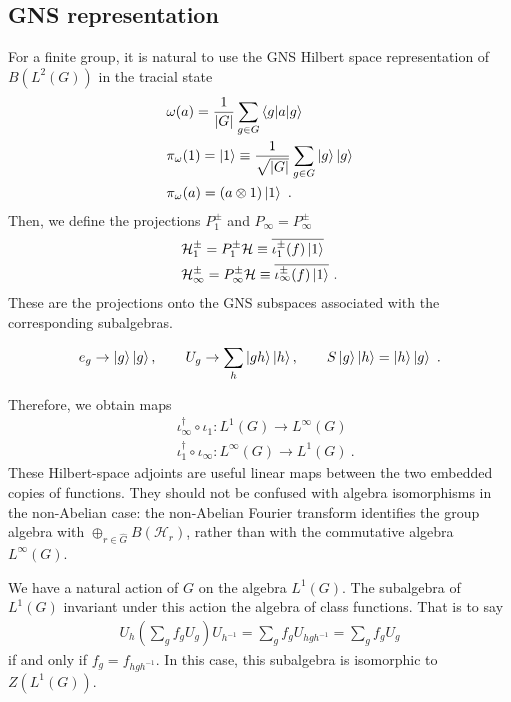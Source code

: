 \documentclass[11pt]{article}
\newcommand{\lb}{\left(}
\newcommand{\rb}{\right)}
\newcommand{\mH}{\mathcal{H}}
\newcommand{\nn}{\nonumber}
\begin{document}
\subsection{GNS representation}

For a finite group, it is natural to use the GNS Hilbert space representation of $B(L^2(G))$ in the tracial state
\begin{align}
    &\omega(a)=\frac{1}{|G|}\sum_{g\in G}\braket{g| a |g}\nn\\
    &\pi_\omega(1)=\ket{1}\equiv\frac{1}{\sqrt{|G|}}\sum_{g\in G}\ket{g}\ket{g}\nn\\
    &\pi_\omega(a)=(a\otimes 1)\ket{1}\ .
\end{align}
Then, we define the projections $P_1^\pm$ and $P_\infty=P_\infty^\pm$
\begin{align}
    &\mH_1^\pm=P_1^\pm\mH\equiv \overline{\iota_1^\pm(f)\ket{1}}\nn\\
    &\mH_\infty^\pm=P_\infty^\pm\mH\equiv \overline{\iota_\infty^\pm(f)\ket{1}}\ .
\end{align}
These are the projections onto the GNS subspaces associated with the corresponding subalgebras.

\begin{align}
    e_g\to \ket{g}\ket{g},\qquad U_g\to \sum_h \ket{g h}\ket{h}, \qquad S\ket{g}\ket{h}=\ket{h}\ket{g}\ .
\end{align}


Therefore, we obtain maps 
\begin{align}
    &\iota_\infty^\dagger\circ \iota_1:L^1(G)\to L^\infty(G)\nn\\
    &\iota_1^\dagger\circ \iota_\infty:L^\infty(G)\to L^1(G)\ .
\end{align}
These Hilbert-space adjoints are useful linear maps between the two embedded copies of functions. They should not be confused with algebra isomorphisms in the non-Abelian case: the non-Abelian Fourier transform identifies the group algebra with $\oplus_{r\in\hat G}B(\mH_r)$, rather than with the commutative algebra $L^\infty(G)$.

We have a natural action of $G$ on the algebra $L^1(G)$. The subalgebra of $L^1(G)$ invariant under this action the algebra of class functions. That is to say
\begin{align}
    U_h \lb \sum_g f_g U_g\rb U_{h^{-1}}=\sum_g f_g U_{h g h^{-1}}=\sum_g f_g U_g
\end{align}
if and only if $f_g=f_{h g h^{-1}}$. In this case, this subalgebra is isomorphic to $Z(L^1(G))$.
\end{document}
